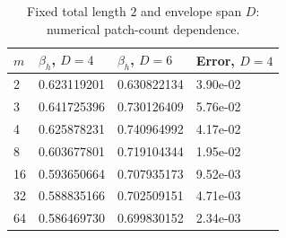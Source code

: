 \begin{table}[htbp]
\centering
\caption{Fixed total length $2$ and envelope span $D$: numerical patch-count dependence.}
\label{tab:fixed_span}
\begin{tabular}{llll}
\toprule
$m$ & $\beta_h$, $D=4$ & $\beta_h$, $D=6$ & Error, $D=4$ \\
\midrule
2 & 0.623119201 & 0.630822134 & 3.90e-02 \\
3 & 0.641725396 & 0.730126409 & 5.76e-02 \\
4 & 0.625878231 & 0.740964992 & 4.17e-02 \\
8 & 0.603677801 & 0.719104344 & 1.95e-02 \\
16 & 0.593650664 & 0.707935173 & 9.52e-03 \\
32 & 0.588835166 & 0.702509151 & 4.71e-03 \\
64 & 0.586469730 & 0.699830152 & 2.34e-03 \\
\bottomrule
\end{tabular}
\end{table}
